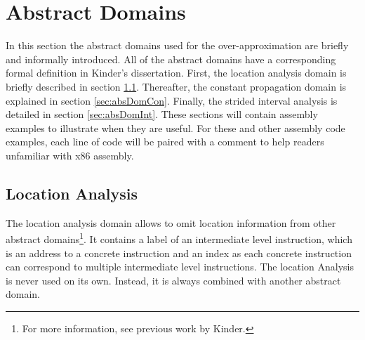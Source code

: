 \documentclass{kththesis}
\newcommand{\fbcomment}[1]{{#1}}
\renewcommand{\fbcomment}[1]{}
\begin{document}
\section{Abstract Domains}\label{sec:absDom}
\fbcomment{\color{red}Goal: Describe the abstract domains of Jakstab and what pros and cons come with each of them.}
In this section the abstract domains used for the over-approximation are briefly and informally introduced. All of the abstract domains have a corresponding formal definition in Kinder's dissertation\cite{Jakstab}. First, the location analysis domain is briefly described in section \ref{sec:absDomLoc}. Thereafter, the constant propagation domain is explained in section \ref{sec:absDomCon}. Finally, the strided interval analysis is detailed in section \ref{sec:absDomInt}. These sections will contain assembly examples to illustrate when they are useful. For these and other assembly code examples, each line of code will be paired with a comment to help readers unfamiliar with x86 assembly.

\subsection{Location Analysis}\label{sec:absDomLoc}
The location analysis domain allows to omit location information from other abstract domains\footnote{For more information, see previous work by Kinder\cite{Jakstab}.}. It contains a label of an intermediate level instruction, which is an address to a concrete instruction and an index as each concrete instruction can correspond to multiple intermediate level instructions. The location Analysis is never used on its own. Instead, it is always combined with another abstract domain.
\end{document}
